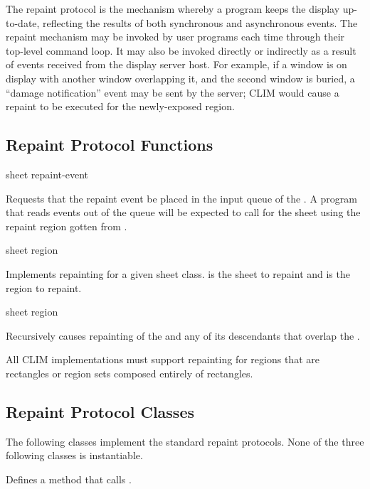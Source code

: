 The repaint protocol is the mechanism whereby a program keeps the display
up-to-date, reflecting the results of both synchronous and asynchronous events.
The repaint mechanism may be invoked by user programs each time through their
top-level command loop.  It may also be invoked directly or indirectly as a
result of events received from the display server host.  For example, if a
window is on display with another window overlapping it, and the second window
is buried, a ``damage notification'' event may be sent by the server; CLIM would
cause a repaint to be executed for the newly-exposed region.


\subsection {Repaint Protocol Functions}

 {sheet repaint-event} 

Requests that the repaint event  be placed in the input queue
of the  .  A program that reads events out of the queue
will be expected to call  for the sheet using the repaint
region gotten from .

 {sheet region} 

Implements repainting for a given sheet class.   is the sheet to
repaint and  is the region to repaint.

 {sheet region} 

Recursively causes repainting of the   and any of its
descendants that overlap the  .

All CLIM implementations must support repainting for regions that are rectangles
or region sets composed entirely of rectangles.


\subsection {Repaint Protocol Classes}

The following classes implement the standard repaint protocols.  None of the
three following classes is instantiable.


Defines a  method that calls .


